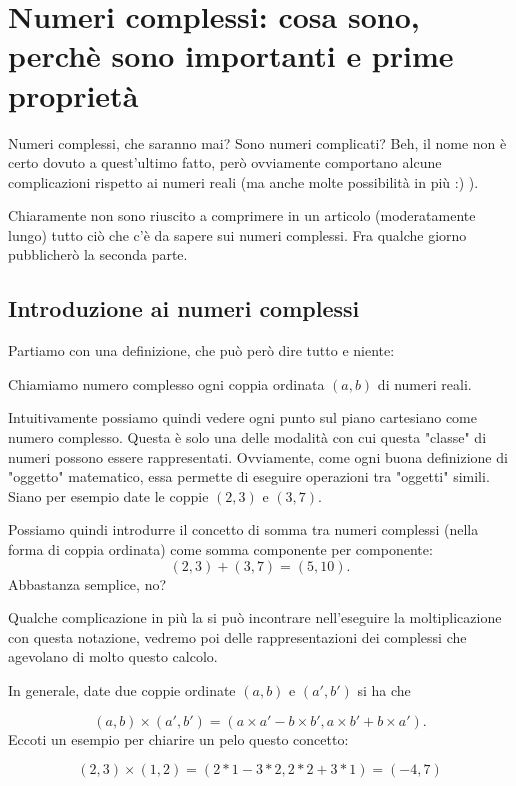 \chapter{Numeri complessi: cosa sono, perchè sono importanti e prime proprietà}

Numeri complessi, che saranno mai? Sono numeri complicati? Beh, il nome non è certo dovuto a quest'ultimo fatto, però ovviamente comportano alcune complicazioni rispetto ai numeri reali (ma anche molte possibilità in più :) ).


Chiaramente non sono riuscito a comprimere in un articolo (moderatamente lungo) tutto ciò che c'è da sapere sui numeri complessi. Fra qualche giorno pubblicherò la seconda parte.

\section{Introduzione ai numeri complessi}

Partiamo con una definizione, che può però dire tutto e niente:

\begin{mydef}
	Chiamiamo numero complesso ogni coppia ordinata $ (a,b) $ di numeri reali.
\end{mydef}

Intuitivamente possiamo quindi vedere ogni punto sul piano cartesiano come numero complesso. Questa è solo una delle modalità con cui questa "classe" di numeri possono essere rappresentati.
Ovviamente, come ogni buona definizione di "oggetto" matematico, essa permette di eseguire operazioni tra "oggetti" simili. Siano per esempio date le coppie $ (2,3) $ e $ (3,7) $.

Possiamo quindi introdurre il concetto di somma tra numeri complessi (nella forma di coppia ordinata) come somma componente per componente:
\[(2,3) + (3,7) = (5,10). \] 
Abbastanza semplice, no?

Qualche complicazione in più la si può incontrare nell'eseguire la moltiplicazione con questa notazione, vedremo poi delle rappresentazioni dei complessi che agevolano di molto questo calcolo.

In generale, date due coppie ordinate $ (a,b) $ e $ (a',b') $ si ha che

\[(a,b) \times (a',b') = (a\times a'-b\times b' , a\times b'+b\times a').\] Eccoti un esempio per chiarire un pelo questo concetto:

\[(2,3) \times (1,2) = (2*1-3*2, 2*2+3*1) = (-4, 7)\]

